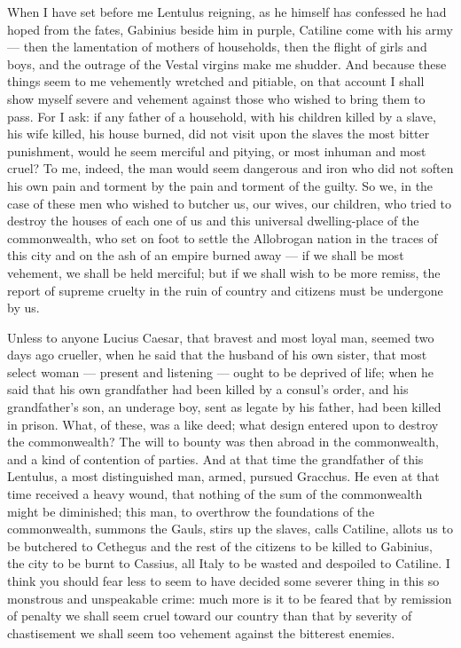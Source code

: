  When I have set before me Lentulus reigning, as he himself has confessed he had hoped from the fates, Gabinius beside him in purple, Catiline come with his army --- then the lamentation of mothers of households, then the flight of girls and boys, and the outrage of the Vestal virgins make me shudder. And because these things seem to me vehemently wretched and pitiable, on that account I shall show myself severe and vehement against those who wished to bring them to pass. For I ask: if any father of a household, with his children killed by a slave, his wife killed, his house burned, did not visit upon the slaves the most bitter punishment, would he seem merciful and pitying, or most inhuman and most cruel? To me, indeed, the man would seem dangerous and iron who did not soften his own pain and torment by the pain and torment of the guilty. So we, in the case of these men who wished to butcher us, our wives, our children, who tried to destroy the houses of each one of us and this universal dwelling-place of the commonwealth, who set on foot to settle the Allobrogan nation in the traces of this city and on the ash of an empire burned away --- if we shall be most vehement, we shall be held merciful; but if we shall wish to be more remiss, the report of supreme cruelty in the ruin of country and citizens must be undergone by us.

 Unless to anyone Lucius Caesar, that bravest and most loyal man, seemed two days ago crueller, when he said that the husband of his own sister, that most select woman --- present and listening --- ought to be deprived of life; when he said that his own grandfather had been killed by a consul's order, and his grandfather's son, an underage boy, sent as legate by his father, had been killed in prison. What, of these, was a like deed; what design entered upon to destroy the commonwealth? The will to bounty was then abroad in the commonwealth, and a kind of contention of parties. And at that time the grandfather of this Lentulus, a most distinguished man, armed, pursued Gracchus. He even at that time received a heavy wound, that nothing of the sum of the commonwealth might be diminished; this man, to overthrow the foundations of the commonwealth, summons the Gauls, stirs up the slaves, calls Catiline, allots us to be butchered to Cethegus and the rest of the citizens to be killed to Gabinius, the city to be burnt to Cassius, all Italy to be wasted and despoiled to Catiline. I think you should fear less to seem to have decided some severer thing in this so monstrous and unspeakable crime: much more is it to be feared that by remission of penalty we shall seem cruel toward our country than that by severity of chastisement we shall seem too vehement against the bitterest enemies.

